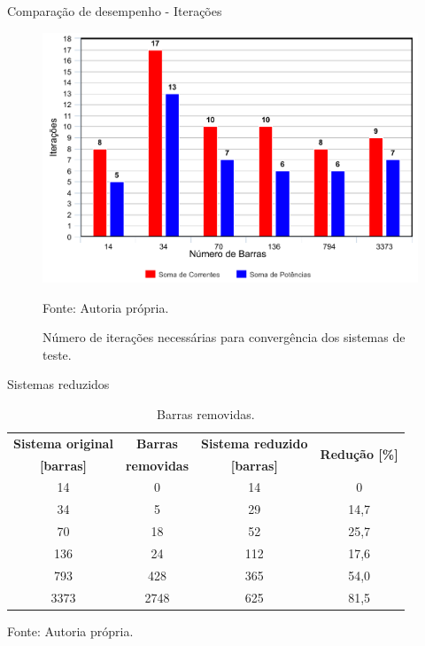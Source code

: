 \documentclass[10pt]{beamer}
\begin{document}
\begin{frame}{Comparação de desempenho - Iterações}
  \begin{figure}[h!]
    \centering
    \caption{Número de iterações necessárias para convergência dos sistemas de teste.}
    \includegraphics[scale=0.5]{img/itera}
    \label{fig:itera}
    
    \small Fonte: Autoria própria.
  \end{figure}
\end{frame}

\begin{frame}{Sistemas reduzidos}
    \begin{table}[h]
      \centering
      \caption{Barras removidas.}
      \begin{tabular}{cccc}
        \toprule
        \multicolumn{1}{c}{\textbf{Sistema original}} & \textbf{Barras} & \multicolumn{1}{c}{\textbf{Sistema reduzido}} & \multirow{ 2}{*}{\textbf{Redução [\%]}} \\
        \multicolumn{1}{c}{\textbf{[barras]}}& \textbf{removidas} & \multicolumn{1}{c}{\textbf{[barras]}} & \\
        \midrule
        14		& 0    & 14  & 0 \\
        34		& 5    & 29  & 14,7 \\
        70		& 18   & 52  & 25,7 \\
        136		& 24   & 112 & 17,6 \\
        793		& 428  & 365 & 54,0 \\
        3373  & 2748 & 625 & 81,5 \\
        \bottomrule
      \end{tabular}
      \label{tab:tempootm}
      
      \small Fonte: Autoria própria.
    \end{table}
\end{frame}
\end{document}
